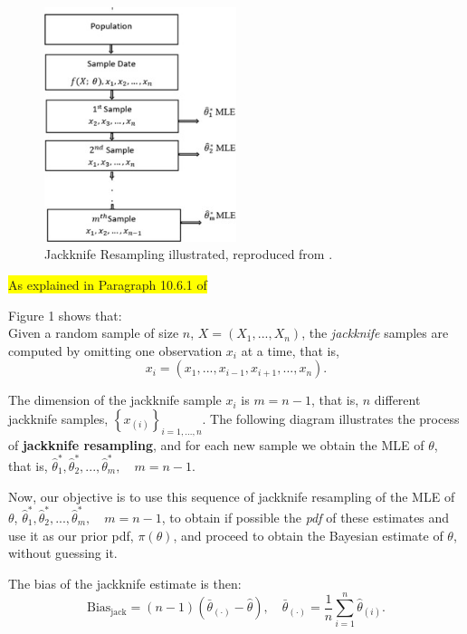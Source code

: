 \documentclass[aodsor,preprint]{imsart}
\numberwithin{equation}{section}
\theoremstyle{plain}
\begin{document}
\begin{figure}[h!]
\centering
\includegraphics[width=0.5\textwidth]{Jackknife.jpg} 
\caption{Jackknife Resampling illustrated, reproduced from \cite{sciencedirectJackknife}.}
\label{fig:jackknife-sd}
\end{figure}

\colorbox{yellow}{As explained in Paragraph 10.6.1 of \cite{sciencedirectJackknife}}

 Figure 1 shows that: \\ Given a random sample of size $n$, $X = (X_1, ..., X_n)$, the \textit{jackknife} samples are computed by omitting one observation $x_i$ at a time, that is,
\[
x_i = (x_1, ..., x_{i-1}, x_{i+1}, ..., x_n).
\]

The dimension of the jackknife sample $x_i$ is $m = n - 1$, that is, $n$ different jackknife samples, $\left\{x_{(i)}\right\}_{i=1, ..., n}$. The following diagram illustrates the process of \textbf{jackknife resampling}, and for each new sample we obtain the MLE of $\theta$, that is, $\hat{\theta}_1^*, \hat{\theta}_2^*, ..., \hat{\theta}_m^*, \quad m = n-1.$


Now, our objective is to use this sequence of jackknife resampling of the MLE of $\theta$, $\hat{\theta}_1^*, \hat{\theta}_2^*, ..., \hat{\theta}_m^*, \quad m = n-1$, to obtain if possible the \textit{pdf} of these estimates and use it as our prior pdf, $\pi(\theta)$, and proceed to obtain the Bayesian estimate of $\theta$, without guessing it.

\newpage

The bias of the jackknife estimate is then:
\[
\text{Bias}_{\text{jack}} = (n - 1)(\bar{\theta}_{(\cdot)} - \hat{\theta}), \quad \bar{\theta}_{(\cdot)} = \frac{1}{n} \sum_{i=1}^{n} \hat{\theta}_{(i)}.
\]
\end{document}

